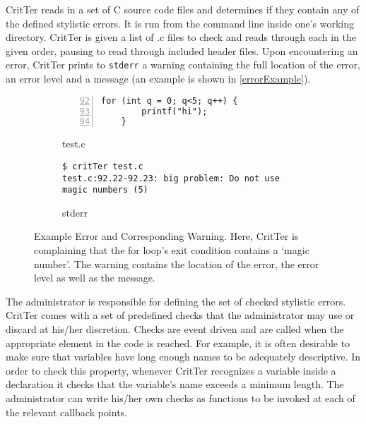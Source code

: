 \documentclass[12pt]{report}
\newcommand{\programName}{CritTer\xspace}
\begin{document}
\programName reads in a set of C source code files and determines if they contain any of the 
defined stylistic errors. It is run from the command line inside one's working directory. \programName is 
given a list of .c files to check and reads through each in the given order, pausing to read through 
included header files. Upon encountering an error, \programName prints to \lstinline{stderr} a warning 
containing the full location of the error, an error level and a message (an example is shown in 
\autoref{errorExample}). 

\begin{figure}
\begin{subfigure}[b]{.49\linewidth}
\caption{test.c}
\label{errorExampleCode}
\begin{lstlisting}[numbers=left, firstnumber=92, xleftmargin=.8cm]
	for (int q = 0; q<5; q++) {
		printf("hi");
	}
\end{lstlisting}
\end{subfigure}
\begin{subfigure}[b]{.49\linewidth}
\caption{stderr}
\label{errorExampleStderr}
\begin{lstlisting}[xleftmargin=.7cm]
$ critTer test.c
test.c:92.22-92.23: big problem: Do not use magic numbers (5)
\end{lstlisting}
\end{subfigure}
\caption[Example Error and Corresponding Warning]{Example Error and Corresponding Warning. Here, \programName is complaining that the for loop's exit condition contains a `magic number'. The warning  contains the location of the error, the error level as well as the message.}
\label{errorExample}
\end{figure}

The administrator is responsible for defining the set of checked stylistic errors. \programName 
comes with a set of predefined checks that the administrator may use or discard at his\slash her 
discretion. Checks are event driven and are called when the appropriate element in the code is reached. 
For example, it is often desirable to make sure that variables have long enough names to be adequately 
descriptive. In order to check this property, whenever \programName recognizes a variable inside a 
declaration it checks that the variable's name exceeds a minimum length. The administrator can write 
his\slash her own checks as functions to be invoked at each of the relevant callback points.
\end{document}
